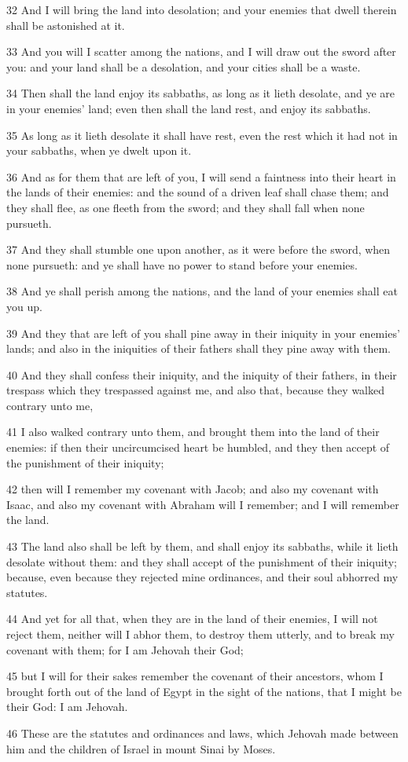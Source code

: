 \par 32 And I will bring the land into desolation; and your enemies that dwell therein shall be astonished at it.
\par 33 And you will I scatter among the nations, and I will draw out the sword after you: and your land shall be a desolation, and your cities shall be a waste.
\par 34 Then shall the land enjoy its sabbaths, as long as it lieth desolate, and ye are in your enemies' land; even then shall the land rest, and enjoy its sabbaths.
\par 35 As long as it lieth desolate it shall have rest, even the rest which it had not in your sabbaths, when ye dwelt upon it.
\par 36 And as for them that are left of you, I will send a faintness into their heart in the lands of their enemies: and the sound of a driven leaf shall chase them; and they shall flee, as one fleeth from the sword; and they shall fall when none pursueth.
\par 37 And they shall stumble one upon another, as it were before the sword, when none pursueth: and ye shall have no power to stand before your enemies.
\par 38 And ye shall perish among the nations, and the land of your enemies shall eat you up.
\par 39 And they that are left of you shall pine away in their iniquity in your enemies' lands; and also in the iniquities of their fathers shall they pine away with them.
\par 40 And they shall confess their iniquity, and the iniquity of their fathers, in their trespass which they trespassed against me, and also that, because they walked contrary unto me,
\par 41 I also walked contrary unto them, and brought them into the land of their enemies: if then their uncircumcised heart be humbled, and they then accept of the punishment of their iniquity;
\par 42 then will I remember my covenant with Jacob; and also my covenant with Isaac, and also my covenant with Abraham will I remember; and I will remember the land.
\par 43 The land also shall be left by them, and shall enjoy its sabbaths, while it lieth desolate without them: and they shall accept of the punishment of their iniquity; because, even because they rejected mine ordinances, and their soul abhorred my statutes.
\par 44 And yet for all that, when they are in the land of their enemies, I will not reject them, neither will I abhor them, to destroy them utterly, and to break my covenant with them; for I am Jehovah their God;
\par 45 but I will for their sakes remember the covenant of their ancestors, whom I brought forth out of the land of Egypt in the sight of the nations, that I might be their God: I am Jehovah.
\par 46 These are the statutes and ordinances and laws, which Jehovah made between him and the children of Israel in mount Sinai by Moses.

